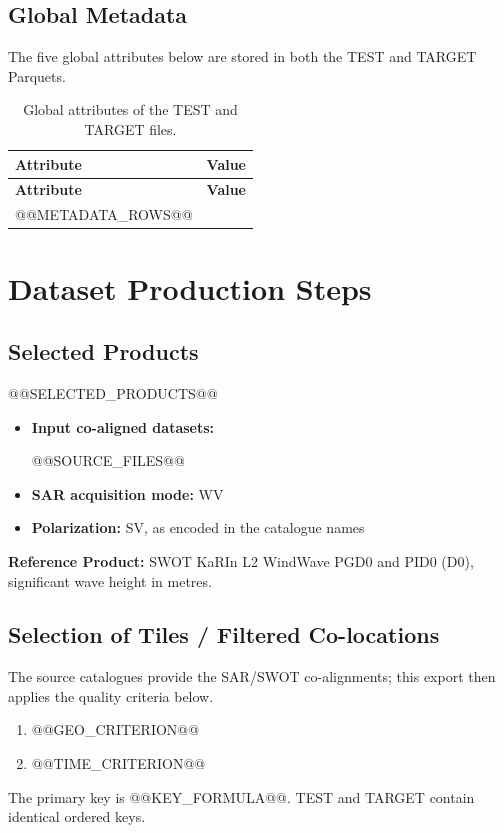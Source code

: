 \documentclass[11pt,a4paper]{article}
\begin{document}
\subsection{Global Metadata}
The five global attributes below are stored in both the TEST and TARGET Parquets.
\begin{longtable}{@{}p{5.4cm}p{8.9cm}@{}}
    \caption{Global attributes of the TEST and TARGET files.\label{tab:metadata}} \\
    \toprule
    \textbf{Attribute} & \textbf{Value} \\
    \midrule
    \endfirsthead
    \toprule
    \textbf{Attribute} & \textbf{Value} \\
    \midrule
    \endhead
    \bottomrule
    \endlastfoot
@@METADATA_ROWS@@
\end{longtable}

\newpage
\section{Dataset Production Steps}
\subsection{Selected Products}
@@SELECTED_PRODUCTS@@
\begin{itemize}
    \item \textbf{Input co-aligned datasets:}
    \begin{itemize}
@@SOURCE_FILES@@
    \end{itemize}
    \item \textbf{SAR acquisition mode:} WV
    \item \textbf{Polarization:} SV, as encoded in the catalogue names
\end{itemize}
\textbf{Reference Product:} SWOT KaRIn L2 WindWave PGD0 and PID0 (D0), significant wave height in metres.

\subsection{Selection of Tiles / Filtered Co-locations}
The source catalogues provide the SAR/SWOT co-alignments; this export then applies the quality criteria below.
\begin{enumerate}
    \item @@GEO_CRITERION@@
    \item @@TIME_CRITERION@@
\end{enumerate}
The primary key is @@KEY_FORMULA@@. TEST and TARGET contain identical ordered keys.
\end{document}
